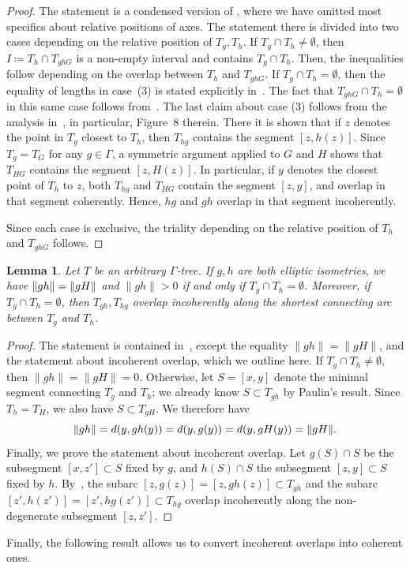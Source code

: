\documentclass[11pt]{amsart}
\numberwithin{equation}{section}
\numberwithin{figure}{section}
\newtheorem{lemma}[theorem]{Lemma}
\theoremstyle{definition}
\theoremstyle{plain}
\DeclarePairedDelimiter\norm{\lVert}{\rVert}
\begin{document}
\begin{proof}
The statement is a condensed version of \cite[Proposition~1.7]{Pa89:Paulin1989TheGT}, where we have omitted most specifics about relative positions of axes. The statement there is divided into two cases depending on the relative position of $T_g, T_h$.  
If $T_g \cap T_h \neq \emptyset$, then $I\coloneqq T_{h} \cap T_{ghG}$ is a non-empty interval and contains $T_g \cap T_h$.
Then, the inequalities follow depending on the overlap between $T_h$ and $T_{ghG}$.
If $T_g \cap T_h = \emptyset$, then the equality of lengths in
case~(3) is stated explicitly
in~\cite[Section~1.5]{CM87:GroupActions}. The fact that
$T_{ghG} \cap T_h = \emptyset$ in this same case follows
from~\cite[Fact~1.7]{CM87:GroupActions}.
The last claim about case (3) follows from the analysis in~\cite[Proposition~1.7(2)]{Pa89:Paulin1989TheGT}, in particular, Figure~8 therein. There it is shown that if $z$ denotes the point in $T_g$ closest to $T_h$, then $T_{hg}$ contains the segment $[z,h(z)]$. Since $T_{g}=T_{G}$ for any $g \in \Gamma$, a symmetric argument applied to $G$ and $H$ shows that $T_{HG}$ contains the segment $[z,H(z)]$. In particular, if $y$ denotes the closest point of $T_h$ to $z$, both $T_{hg}$ and $T_{HG}$ contain the segment $[z,y]$, and overlap in that segment coherently. Hence, $hg$ and $gh$ overlap in that segment incoherently.

Since each case is exclusive, the triality depending on the relative position of $T_h$ and $T_{ghG}$ follows. 
\end{proof}

\begin{lemma}
  Let $T$ be an arbitrary $\Gamma$-tree. If $g,h$ are both elliptic
  isometries, we have $\norm{gh} = \norm{gH}$ and $\|gh\|>0$ if and only if
  $T_g \cap T_h = \emptyset$. Moreover, if $T_g \cap T_h = \emptyset$,
 then $T_{gh}, T_{hg}$ overlap incoherently  along the shortest connecting arc between $T_g$ and $T_h$.
\label{lem:pau_two_ell}
\end{lemma}
\begin{proof}
The statement is contained
in~\cite[Proposition~1.8]{Pa89:Paulin1989TheGT}, except the equality
$\|gh\|=\|gH\|$, and the statement about incoherent overlap, which we outline here. If $T_g \cap T_h \neq
\emptyset$, then $\|gh\|=\|gH\|=0$. Otherwise, let $S=[x,y]$ denote
the minimal segment connecting $T_g$ and $T_h$; we already know $S
\subset T_{gh}$ by Paulin's result. Since $T_h = T_H$, we also have $S
\subset T_{gH}$. We therefore have
\[
  \norm{gh} = d(y,gh(y)) = d(y, g(y)) = d(y, gH(y)) = \norm{gH}.
\]
Finally, we prove the statement about incoherent overlap. Let $g(S) \cap S$ be the subsegment $[x,z'] \subset S$ fixed by $g$, and $h(S) \cap S$ the subsegment $[z,y]\subset S$ fixed by $h$. By~\cite[Figure~9]{Pa89:Paulin1989TheGT}, the subarc $[z,g(z)]=[z,gh(z)] \subset T_{gh}$ and the subarc $[z',h(z')]=[z',hg(z')] \subset T_{hg}$ overlap incoherently along the non-degenerate subsegment $[z,z']$.
\end{proof}
Finally, the following result allows us to convert incoherent overlaps into coherent ones.
\end{document}
